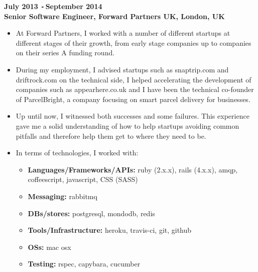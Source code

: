 \documentclass{res}
\def\Minus{\texttt{-}\,}
\begin{document}
\begin{resume}
  {\bf July 2013 \Minus September 2014}\\
  {\bf Senior Software Engineer, Forward Partners UK, London, UK}
    \begin{itemize}
      \item[] At Forward Partners, I worked with a number of different
        startups at different stages of their growth, from early stage companies
        up to companies on their series A funding round.
      \item[] During my employment, I advised startups such as
        snaptrip.com and driftrock.com on the technical side, I helped
        accelerating the development of companies such as appearhere.co.uk
        and I have been the technical co-founder of ParcelBright, a
        company focusing on smart parcel delivery for businesses.
      \item[] Up until now, I witnessed both successes and some failures.
        This experience gave me a solid understanding of how to help startups
        avoiding common pitfalls and therefore help them get to where they
        need to be.
      \item[] In terms of technologies, I worked with:
      \begin{itemize}
        \item[] {\bf Languages/Frameworks/APIs:} ruby (2.x.x), rails
          (4.x.x), amqp, coffeescript, javascript, CSS (SASS)
        \item[] {\bf Messaging:} rabbitmq
        \item[] {\bf DBs/stores:} postgresql, mondodb, redis
        \item[] {\bf Tools/Infrastructure:} heroku, travis-ci, git, github
        \item[] {\bf OSs:} mac osx
        \item[] {\bf Testing:} rspec, capybara, cucumber
      \end{itemize}
    \end{itemize}


\end{resume}
\end{document}
